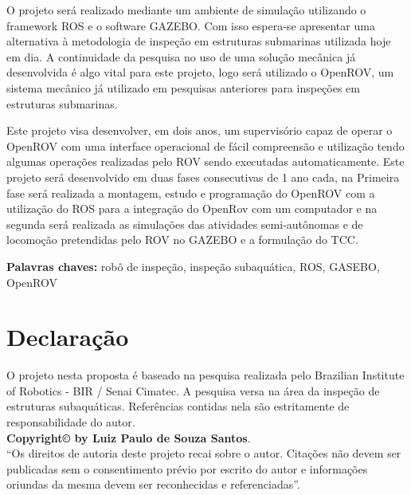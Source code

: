 O projeto será realizado mediante um ambiente de simulação utilizando o framework ROS e o software GAZEBO. Com isso espera-se apresentar uma alternativa à metodologia de inspeção em estruturas submarinas utilizada hoje em dia. A continuidade da pesquisa no uso de uma solução mecânica já desenvolvida é algo vital para este projeto, logo será utilizado o OpenROV, um sistema mecânico já utilizado em pesquisas anteriores para inspeções em estruturas submarinas.

Este projeto visa desenvolver, em dois anos, um supervisório capaz de operar o OpenROV  com uma interface operacional de fácil compreensão e utilização tendo algumas operações realizadas pelo ROV sendo executadas automaticamente. Este projeto será desenvolvido em duas fases consecutivas de 1 ano cada, na Primeira fase será realizada a montagem, estudo e programação do OpenROV com a utilização do ROS para a integração do OpenRov com um computador e na segunda será realizada as simulações das atividades semi-autônomas e de locomoção pretendidas pelo ROV no GAZEBO e a formulação do TCC.


\vspace*{1cm}
\noindent \textbf{Palavras chaves: }robô de inspeção, inspeção subaquática, ROS, GASEBO, OpenROV

\chapter*{Declaração}
O projeto nesta proposta é baseado na pesquisa realizada pelo Brazilian Institute of Robotics - BIR / Senai Cimatec. A pesquisa versa na área da inspeção de estruturas subaquáticas. Referências contidas nela são estritamente de responsabilidade do autor.\\
\vspace*{8cm}
\vfill
\noindent \textbf{Copyright\copyright{} by Luiz Paulo de Souza Santos}.\\
``Os direitos de autoria deste projeto recai sobre o autor. Citações não devem ser publicadas sem o consentimento prévio por escrito do autor e informações oriundas da mesma devem ser reconhecidas e referenciadas''.



